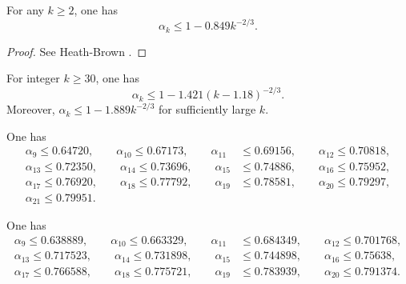 \begin{lemma}\label{hb-alpha-large}
For any $k \ge 2$, one has
\[
\alpha_k \le 1 - 0.849k^{-2/3}.
\]
\end{lemma}
\begin{proof}
See Heath-Brown \cite{heathbrown_new_2017}.
\end{proof}

\begin{theorem}For integer $k \ge 30$, one has
\[
\alpha_k \leq 1 - 1.421(k - 1.18)^{-2/3}.
\]
Moreover, $\alpha_k \leq 1 - 1.889k^{-2/3}$ for sufficiently large $k$.
\end{theorem}

\begin{theorem}One has
\begin{align*}
\alpha_{9} \le 0.64720,\qquad \alpha_{10} \le 0.67173,\qquad \alpha_{11} &\le 0.69156,\qquad \alpha_{12} \le 0.70818,\\
\alpha_{13} \le 0.72350, \qquad \alpha_{14} \le 0.73696,\qquad \alpha_{15} &\le 0.74886,\qquad \alpha_{16} \le 0.75952,\\
\alpha_{17} \le 0.76920, \qquad \alpha_{18} \le 0.77792,\qquad \alpha_{19} &\le 0.78581,\qquad \alpha_{20} \le 0.79297,\\
\alpha_{21} \le 0.79951.
\end{align*}
\end{theorem}

\begin{theorem}One has
\begin{align*}
\alpha_{9} \le 0.638889,\qquad \alpha_{10} \le 0.663329,\qquad \alpha_{11} &\le 0.684349,\qquad \alpha_{12} \le 0.701768,\\
\alpha_{13} \le 0.717523, \qquad \alpha_{14} \le 0.731898,\qquad \alpha_{15} &\le 0.744898,\qquad \alpha_{16} \le 0.75638,\\
\alpha_{17} \le 0.766588, \qquad \alpha_{18} \le 0.775721,\qquad \alpha_{19} &\le 0.783939,\qquad \alpha_{20} \le 0.791374.
\end{align*}
\end{theorem}
